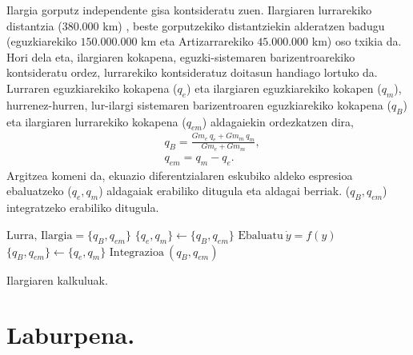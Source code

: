 Ilargia gorputz independente gisa kontsideratu zuen. Ilargiaren lurrarekiko distantzia ($380.000$ km) , beste gorputzekiko distantziekin alderatzen badugu (eguzkiarekiko $150.000.000$ km eta Artizarrarekiko $45.000.000$ km) oso txikia da. Hori dela eta, ilargiaren kokapena, eguzki-sistemaren barizentroarekiko kontsideratu ordez, lurrarekiko kontsideratuz doitasun handiago lortuko da. Lurraren eguzkiarekiko kokapena ($q_e$) eta ilargiaren eguzkiarekiko kokapen ($q_m$), hurrenez-hurren, lur-ilargi sistemaren barizentroaren eguzkiarekiko kokapena ($q_B$) eta  ilargiaren lurrarekiko kokapena ($q_{em}$) aldagaiekin ordezkatzen dira,
\begin{align*}
& q_B =\frac{Gm_e \ q_e+Gm_m \ q_m}{Gm_e+Gm_m},\\
& q_{em} =q_m-q_e.
\end{align*}
Argitzea komeni da, ekuazio diferentzialaren eskubiko aldeko espresioa ebaluatzeko ($q_e,q_m$) aldagaiak erabiliko ditugula eta aldagai berriak. ($q_B,q_{em}$) integratzeko erabiliko ditugula.

\begin{algorithm}[H]
 \BlankLine
  $\mbox{Lurra, Ilargia}=\{q_B,q_{em}\}$\;
  {
   \BlankLine
     $\{q_e,q_m\} \leftarrow \{q_B,q_{em}\} $\;
     $\mbox{Ebaluatu} \ \dot{y}=f(y)$\;
     $ \{q_B,q_{em}\} \leftarrow \{q_e,q_m\} $\;
     $\mbox{Integrazioa}\ (q_B,q_{em})$\;
   \BlankLine
  }
 \caption{Ilargiaren kalkuluak.}
\end{algorithm}

\begin{table}[h]
\caption{Ilargiaren Lurrarekiko hasierako balioak.}
\label{tab:1}       %
\centering
{}
\end{table}     
          

\section{Laburpena.}

